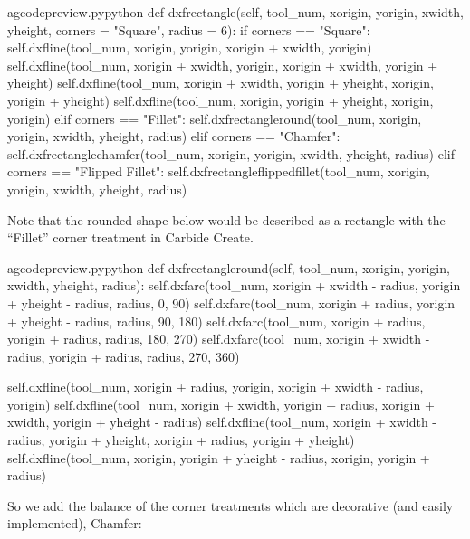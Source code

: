 \documentclass{ltxdoc}
\begin{document}
\lstset{firstnumber=\thegcpy}
\begin{writecode}{a}{gcodepreview.py}{python}
    def dxfrectangle(self, tool_num, xorigin, yorigin, xwidth, yheight, corners = "Square", radius = 6):
        if corners == "Square":
            self.dxfline(tool_num, xorigin, yorigin, xorigin + xwidth, yorigin)
            self.dxfline(tool_num, xorigin + xwidth, yorigin, xorigin + xwidth, yorigin + yheight)
            self.dxfline(tool_num, xorigin + xwidth, yorigin + yheight, xorigin, yorigin + yheight)
            self.dxfline(tool_num, xorigin, yorigin + yheight, xorigin, yorigin)
        elif corners == "Fillet":
            self.dxfrectangleround(tool_num, xorigin, yorigin, xwidth, yheight, radius)
        elif corners == "Chamfer":
            self.dxfrectanglechamfer(tool_num, xorigin, yorigin, xwidth, yheight, radius)
        elif corners == "Flipped Fillet":
            self.dxfrectangleflippedfillet(tool_num, xorigin, yorigin, xwidth, yheight, radius)

\end{writecode}
\addtocounter{gcpy}{13}

Note that the rounded shape below would be described as a rectangle with the ``Fillet'' corner treatment in Carbide Create.

\lstset{firstnumber=\thegcpy}
\begin{writecode}{a}{gcodepreview.py}{python}
    def dxfrectangleround(self, tool_num, xorigin, yorigin, xwidth, yheight, radius):
        self.dxfarc(tool_num, xorigin + xwidth - radius, yorigin + yheight - radius, radius,  0, 90)
        self.dxfarc(tool_num, xorigin + radius, yorigin + yheight - radius, radius, 90, 180)
        self.dxfarc(tool_num, xorigin + radius, yorigin + radius, radius, 180, 270)
        self.dxfarc(tool_num, xorigin + xwidth - radius, yorigin + radius, radius, 270, 360)

        self.dxfline(tool_num, xorigin + radius, yorigin, xorigin + xwidth - radius, yorigin)
        self.dxfline(tool_num, xorigin + xwidth, yorigin + radius, xorigin + xwidth, yorigin + yheight - radius)
        self.dxfline(tool_num, xorigin + xwidth - radius, yorigin + yheight, xorigin + radius, yorigin + yheight)
        self.dxfline(tool_num, xorigin, yorigin + yheight - radius, xorigin, yorigin + radius)

\end{writecode}
\addtocounter{gcpy}{11}

So we add the balance of the corner treatments which are decorative (and easily implemented), Chamfer:
\end{document}
